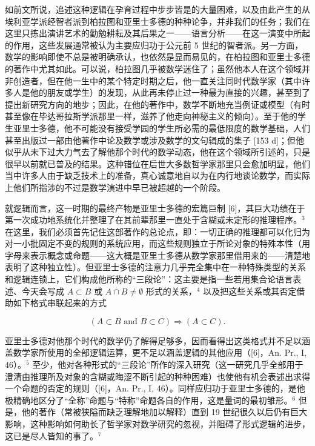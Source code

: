 如前文所说，追述这种逻辑在孕育过程中步步皆是的大量困难，以及由此产生的从埃利亚学派经智者派到柏拉图和亚里士多德的种种论争，并非我们的任务；我们在这里只拣出演讲艺术的勤勉耕耘及其后果之一——语言分析——在这一演变中所起的作用，这些发展通常被认为主要应归功于公元前 5 世纪的智者派。另一方面，数学的影响即使不总是被明确承认，也依然是显而易见的，在柏拉图和亚里士多德的著作中尤其如此。可以说，柏拉图几乎被数学迷住了；虽然他本人在这个领域并非创造者，但在他一生中的某个特定时期之后，他一直关注同时代数学家（其中许多人是他的朋友或学生）的发现，从此再未停止过一种最为直接的兴趣，甚至到了提出新研究方向的地步；因此，在他的著作中，数学不断地充当例证或模型（有时甚至像在毕达哥拉斯学派那里一样，滋养了他走向神秘主义的倾向）。至于他的学生亚里士多德，他不可能没有接受学园的学生所必需的最低限度的数学基础，人们甚至出版过一部由他著作中论及数学或涉及数学的文句辑成的集子 {[}153 d{]}；但他似乎从未下过大力气去了解他那个时代的数学动态，他在这个领域所引述的，只是很早以前就已普及的结果。这种错位在后世大多数哲学家那里只会愈加明显，他们当中许多人由于缺乏技术上的准备，真心诚意地自以为在内行地谈论数学，而实际上他们所指涉的不过是数学演进中早已被超越的一个阶段。

就逻辑而言，这一时期的最终产物是亚里士多德的宏篇巨制 {[}6{]}，其巨大功绩在于第一次成功地系统化并整理了在其前辈那里一直处于含糊或未定形的推理程序。\(^{3}\) 在这里，我们必须首先记住这部著作的总论点，即：一切正确的推理都可以化归为对一小批固定不变的规则的系统应用，而这些规则独立于所论对象的特殊本性（用字母来表示概念或命题——这大概是亚里士多德从数学家那里借用来的——清楚地表明了这种独立性）。但亚里士多德的注意力几乎完全集中在一种特殊类型的关系和逻辑连锁上，它们构成他所称的“三段论”：这主要是指一些若用集合论语言表述、今天会写成 \(A \subset B\) 或 \(A \cap B \neq \emptyset\) 形式的关系，\(^{4}\) 以及把这些关系或其否定借助如下格式串联起来的方式

\[
(A \subset B \text {   and   } B \subset C) \Rightarrow (A \subset C).
\]

亚里士多德对他那个时代的数学仍了解得足够多，因而看得出这类格式并不足以涵盖数学家所使用的全部逻辑运算，更不足以涵盖逻辑的其他应用（{[}6{]}，An. Pr., I, 46）。\(^{5}\) 至少，他对各种形式的“三段论”所作的深入研究（这一研究几乎全部用于澄清由推理所及对象的含糊或晦涩不断引起的种种困难）也使他有机会表述出求得一个命题的否定的规则（{[}6{]}，An. Pr., I, 46）。同样应归功于亚里士多德的，是他极精确地区分了“全称”命题与“特称”命题各自的作用，这是量词的最初雏形。\(^{6}\) 但是，他的著作（常被狭隘而缺乏理解地加以解释）直到 19 世纪很久以后仍有巨大影响，这种影响如何助长了哲学家对数学研究的忽视，并阻碍了形式逻辑的进步，这已是尽人皆知的事了。\(^{7}\)

